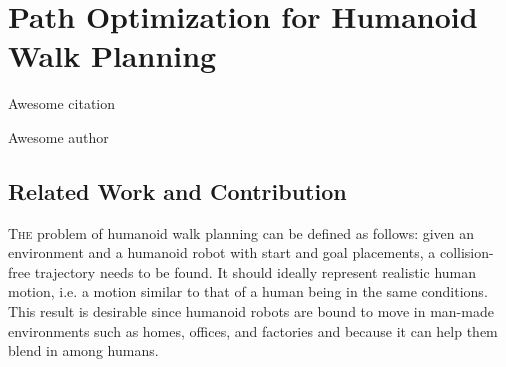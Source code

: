\chapter{Path Optimization for Humanoid Walk Planning}\label{chap:chap1}

\epigraph{Awesome citation}{Awesome author}
\clearpage

\section{Related Work and Contribution}
\lettrine[lines=2, lraise=0.1, nindent=0em, slope=-.5em]%
{T}{he} problem of humanoid walk planning can be defined as
follows: given an environment and a humanoid robot with start and goal
placements, a collision-free trajectory needs to be found. It should
ideally represent realistic human motion, i.e. a motion similar to
that of a human being in the same conditions. This result is desirable
since humanoid robots are bound to move in man-made environments such
as homes, offices, and factories and because it can help them blend in
among humans.


